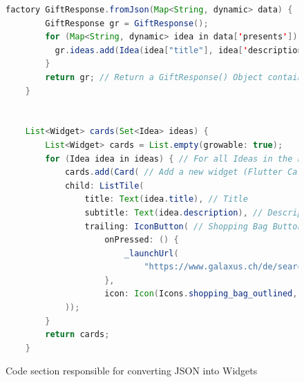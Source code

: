 \begin{figure}[!h]
	\begin{lstlisting}[language=Java]
    factory GiftResponse.fromJson(Map<String, dynamic> data) {
        GiftResponse gr = GiftResponse();
        for (Map<String, dynamic> idea in data['presents']) { // Extract "present" objects
          gr.ideas.add(Idea(idea["title"], idea['description'])); // Fill information into new Idea() Object
        }
        return gr; // Return a GiftResponse() Object containing Ideas()
    }


    List<Widget> cards(Set<Idea> ideas) {
        List<Widget> cards = List.empty(growable: true);
        for (Idea idea in ideas) { // For all Ideas in the List
            cards.add(Card( // Add a new widget (Flutter Card Widget in this Case)
            child: ListTile(
                title: Text(idea.title), // Title
                subtitle: Text(idea.description), // Description
                trailing: IconButton( // Shopping Bag Button
                    onPressed: () {
                        _launchUrl(
                            "https://www.galaxus.ch/de/search?searchSectors=0&q=${idea.title}");
                    },
                    icon: Icon(Icons.shopping_bag_outlined, color: Colors.green,))),
            ));
        }
        return cards;
    }
\end{lstlisting}
	\caption{Code section responsible for converting JSON into Widgets}
\end{figure}
